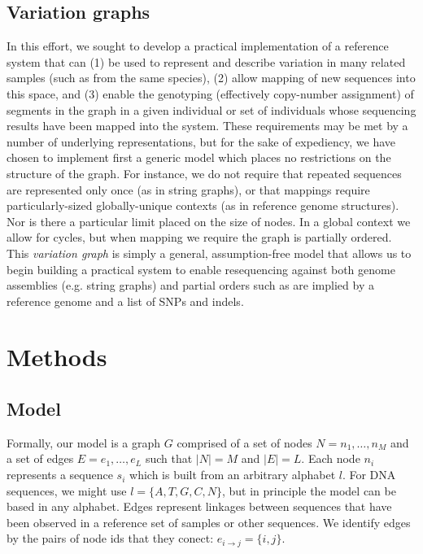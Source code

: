 \documentclass{article}
\begin{document}
\subsection{Variation graphs}

In this effort, we sought to develop a practical implementation of a reference system that can (1) be used to represent and describe variation in many related samples (such as from the same species), (2) allow mapping of new sequences into this space, and (3) enable the genotyping (effectively copy-number assignment) of segments in the graph in a given individual or set of individuals whose sequencing results have been mapped into the system. These requirements may be met by a number of underlying representations, but for the sake of expediency, we have chosen to implement first a generic model which places no restrictions on the structure of the graph. For instance, we do not require that repeated sequences are represented only once (as in string graphs), or that mappings require particularly-sized globally-unique contexts (as in reference genome structures). Nor is there a particular limit placed on the size of nodes. In a global context we allow for cycles, but when mapping we require the graph is partially ordered. This \emph{variation graph} is simply a general, assumption-free model that allows us to begin building a practical system to enable resequencing against both genome assemblies (e.g. string graphs) and partial orders such as are implied by a reference genome and a list of SNPs and indels.

\section{Methods}

\subsection{Model}

Formally, our model is a graph $G$ comprised of a set of nodes $N = n_1, \ldots ,n_M$ and a set of edges $E = e_1, \ldots, e_L$ such that $|N| = M$ and $|E| = L$. Each node $n_i$ represents a sequence $s_i$ which is built from an arbitrary alphabet $l$.
For DNA sequences, we might use $l = \{ A, T, G, C, N \}$, but in principle the model can be based in any alphabet.
Edges represent linkages between sequences that have been observed in a reference set of samples or other sequences. We identify edges by the pairs of node ids that they conect: $e_{i \rightarrow j} = \{ i, j \}$.
\end{document}
